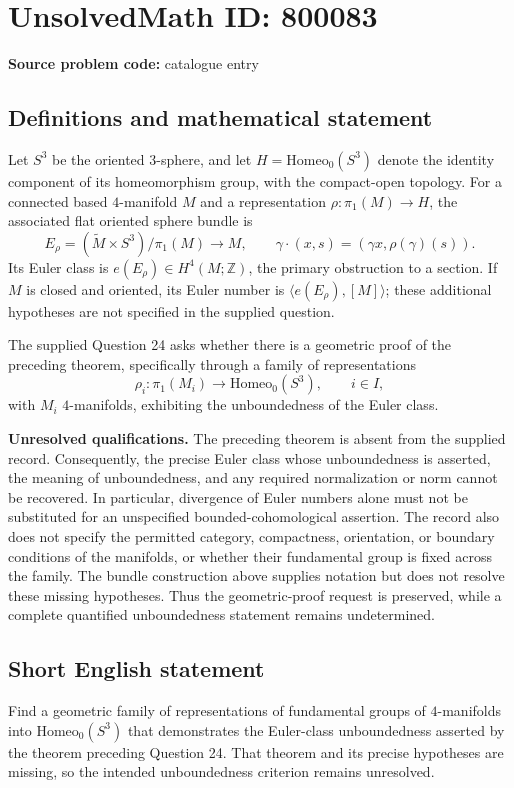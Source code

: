 \documentclass[11pt]{article}
\newcommand{\Z}{\mathbb{Z}}
\begin{document}
\section*{UnsolvedMath ID: 800083}
\textbf{Source problem code:} catalogue entry
\subsection{Definitions and mathematical statement}
Let \(S^3\) be the oriented \(3\)-sphere, and let \(H=\mathrm{Homeo}_0(S^3)\) denote the identity component of its homeomorphism group, with the compact-open topology. For a connected based \(4\)-manifold \(M\) and a representation \(\rho:\pi_1(M)\to H\), the associated flat oriented sphere bundle is
\[
E_\rho=(\widetilde M\times S^3)/\pi_1(M)\longrightarrow M,
\qquad
\gamma\cdot(x,s)=(\gamma x,\rho(\gamma)(s)).
\]
Its Euler class is \(e(E_\rho)\in H^4(M;\Z)\), the primary obstruction to a section. If \(M\) is closed and oriented, its Euler number is \(\langle e(E_\rho),[M]\rangle\); these additional hypotheses are not specified in the supplied question.

The supplied Question 24 asks whether there is a geometric proof of the preceding theorem, specifically through a family of representations
\[
\rho_i:\pi_1(M_i)\longrightarrow \mathrm{Homeo}_0(S^3),\qquad i\in I,
\]
with \(M_i\) \(4\)-manifolds, exhibiting the unboundedness of the Euler class.

\textbf{Unresolved qualifications.} The preceding theorem is absent from the supplied record. Consequently, the precise Euler class whose unboundedness is asserted, the meaning of unboundedness, and any required normalization or norm cannot be recovered. In particular, divergence of Euler numbers alone must not be substituted for an unspecified bounded-cohomological assertion. The record also does not specify the permitted category, compactness, orientation, or boundary conditions of the manifolds, or whether their fundamental group is fixed across the family. The bundle construction above supplies notation but does not resolve these missing hypotheses. Thus the geometric-proof request is preserved, while a complete quantified unboundedness statement remains undetermined.
\subsection{Short English statement}
Find a geometric family of representations of fundamental groups of \(4\)-manifolds into \(\mathrm{Homeo}_0(S^3)\) that demonstrates the Euler-class unboundedness asserted by the theorem preceding Question 24. That theorem and its precise hypotheses are missing, so the intended unboundedness criterion remains unresolved.
\end{document}
